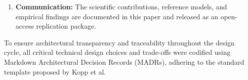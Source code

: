 \begin{enumerate}[leftmargin=1.2em, itemsep=3pt, topsep=4pt]
    \item \textbf{Communication:} The scientific contributions, reference models, and empirical findings are documented in this paper and released as an open-access replication package.
\end{enumerate}

To ensure architectural transparency and traceability throughout the design cycle, all critical technical design choices and trade-offs were codified using Markdown Architectural Decision Records (MADRs), adhering to the standard template proposed by Kopp et al.
